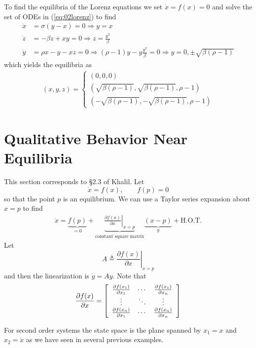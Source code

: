 To find the equilibria of the Lorenz equations we set $\dot{x}=f(x)=0$ and solve the set of ODEs in (\ref{eq:02lorenz}) to find
\begin{align*}
\dot{x} &= \sigma(y-x) = 0 \Rightarrow y = x \\
\dot{z} &= -\beta z + xy = 0 \Rightarrow z = \frac{y^2}{\beta} \\
\dot{y} &= \rho x-y-xz = 0 \Rightarrow (\rho-1)y - y\frac{y^2}{\beta} = 0 \Rightarrow y = 0, \pm\sqrt{\beta(\rho-1)}
\end{align*}
which yields the equilibria as
\begin{align*}
(x,y,z) = \begin{cases} (0,0,0) \\ (\sqrt{\beta(\rho-1)}, \sqrt{\beta(\rho-1)}, \rho-1) \\ (-\sqrt{\beta(\rho-1)}, -\sqrt{\beta(\rho-1)}, \rho-1) \end{cases}
\end{align*}

\section{Qualitative Behavior Near Equilibria}
This section corresponds to \S2.3 of Khalil. Let
$$\dot{x} = f(x), \qquad f(p) = 0$$
so that the point $p$ is an equilibrium.
We can use a Taylor series expansion about $x=p$ to find
\begin{align*}
\dot{x} = \underbrace{f(p)}_{=0} + \underbrace{\left.\frac{\partial f(x)}{\partial x}\right|_{x=p}}_{\text{constant square matrix}} \underbrace{(x-p)}_{y} + \text{H.O.T.}
\end{align*}
Let
$$A \triangleq \left.\frac{\partial f(x)}{\partial x}\right|_{x=p}$$
and then the linearization is $\dot{y}=Ay$. Note that
\begin{align*}
\frac{\partial f(x)}{\partial x} = \left[\begin{array}{c c c} \frac{\partial f(x_1)}{\partial x_1} & \cdots & \frac{\partial f(x_1)}{\partial x_n} \\ \vdots & \ddots & \vdots \\ \frac{\partial f(x_n)}{\partial x_1} & \cdots & \frac{\partial f(x_n)}{\partial x_n} \end{array}\right]
\end{align*}

For second order systems the state space is the plane spanned by $x_1 = x$ and $x_2 = \dot{x}$ as we have seen in several previous examples.

